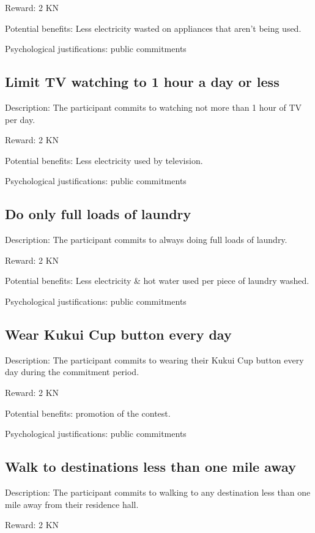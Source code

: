Reward: 2 KN

Potential benefits: Less electricity wasted on appliances that aren't being used.

Psychological justifications: public commitments

\subsection{Limit TV watching to 1 hour a day or less}

Description: The participant commits to watching not more than 1 hour of TV per day.

Reward: 2 KN

Potential benefits: Less electricity used by television.

Psychological justifications: public commitments

\subsection{Do only full loads of laundry}

Description: The participant commits to always doing full loads of laundry.

Reward: 2 KN

Potential benefits: Less electricity \& hot water used per piece of laundry washed.

Psychological justifications: public commitments

\subsection{Wear Kukui Cup button every day}

Description: The participant commits to wearing their Kukui Cup button every day during the commitment period.

Reward: 2 KN

Potential benefits: promotion of the contest.

Psychological justifications: public commitments

\subsection{Walk to destinations less than one mile away}

Description: The participant commits to walking to any destination less than one mile away from their residence hall.

Reward: 2 KN

